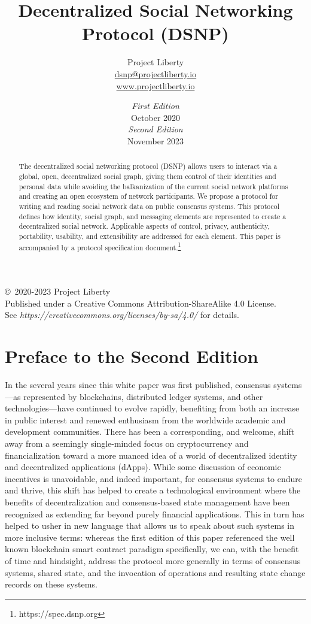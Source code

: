 \documentclass[12pt,letterpaper]{article}
\title{Decentralized Social Networking Protocol (DSNP)}
\author{
	Project Liberty\\
	\href{mailto:dsnp@projectliberty.io}{dsnp@projectliberty.io}\\
	\url{www.projectliberty.io}
}
\date{\textit{First Edition}\\
October 2020\\
\textit{Second Edition}\\
November 2023}
\begin{document}
\maketitle

\begin{abstract}
	The decentralized social networking protocol (DSNP) allows users to interact via a global,
	open, decentralized social graph, giving them control of their identities and personal data
	while avoiding the balkanization of the current social network
	platforms and creating an open ecosystem of network participants. We propose a protocol
	for writing and reading social network data on public consensus systems.
	This protocol defines how identity, social graph, and messaging elements are represented
	to create a decentralized social network. Applicable aspects of control, privacy,
	authenticity, portability, usability, and extensibility are addressed for each element.
	This paper is accompanied by a protocol specification document.\footnote{https://spec.dsnp.org}
\end{abstract}

\vfill
\copyright\, 2020-2023 Project Liberty\\
Published under a Creative Commons Attribution-ShareAlike 4.0 License.\\
See \textit{https://creativecommons.org/licenses/by-sa/4.0/} for details.

\thispagestyle{empty}
\clearpage

\raggedright

\section*{Preface to the Second Edition}

In the several years since this white paper was first published, consensus systems---as
represented by blockchains, distributed ledger systems, and other technologies---have
continued to evolve rapidly, benefiting from both an increase in public interest and renewed
enthusiasm from the worldwide academic and development communities. There has been a
corresponding, and welcome, shift away from a seemingly single-minded focus on
cryptocurrency and financialization toward a more nuanced idea of a world of decentralized
identity and decentralized applications (dApps). While some discussion of economic
incentives is unavoidable, and indeed important, for consensus systems to endure and thrive,
this shift has helped to create a technological environment where the benefits of
decentralization and consensus-based state management have been recognized as extending far
beyond purely financial applications. This in turn has helped to usher in new language that
allows us to speak about such systems in more inclusive terms: whereas the first edition of
this paper referenced the well known blockchain smart contract paradigm specifically, we
can, with the benefit of time and hindsight, address the protocol more generally in terms of
consensus systems, shared state, and the invocation of operations and resulting state change
records on these systems.
\end{document}
